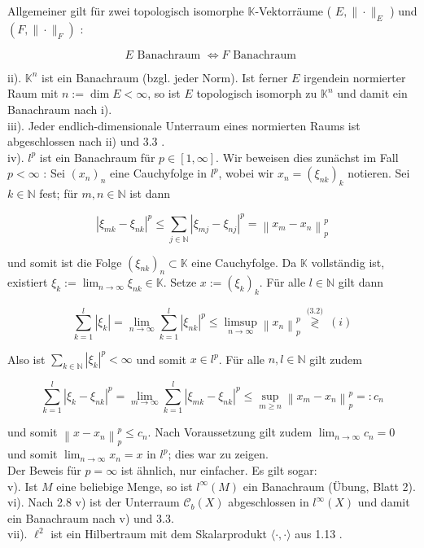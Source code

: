 \documentclass[10pt, letterpaper]{article}
\begin{document}
Allgemeiner gilt für zwei topologisch isomorphe $\mathbb{K}$-Vektorräume ( $E,\|\cdot\|_{E}$ ) und $\left(F,\|\cdot\|_{F}\right)$ :

$$
E \text { Banachraum } \Longleftrightarrow F \text { Banachraum }
$$

ii). $\mathbb{K}^{n}$ ist ein Banachraum (bzgl. jeder Norm). Ist ferner $E$ irgendein normierter Raum mit $n:=\operatorname{dim} E<\infty$, so ist $E$ topologisch isomorph zu $\mathbb{K}^{n}$ und damit ein Banachraum nach i).\\
iii). Jeder endlich-dimensionale Unterraum eines normierten Raums ist abgeschlossen nach ii) und 3.3 .\\
iv). $l^{p}$ ist ein Banachraum für $p \in[1, \infty]$. Wir beweisen dies zunächst im Fall $p<\infty$ : Sei $\left(x_{n}\right)_{n}$ eine Cauchyfolge in $l^{p}$, wobei wir $x_{n}=\left(\xi_{n k}\right)_{k}$ notieren. Sei $k \in \mathbb{N}$ fest; für $m, n \in \mathbb{N}$ ist dann

$$
\left|\xi_{m k}-\xi_{n k}\right|^{p} \leq \sum_{j \in \mathbb{N}}\left|\xi_{m j}-\xi_{n j}\right|^{p}=\left\|x_{m}-x_{n}\right\|_{p}^{p}
$$

und somit ist die Folge $\left(\xi_{n k}\right)_{n} \subset \mathbb{K}$ eine Cauchyfolge. Da $\mathbb{K}$ vollständig ist, existiert $\xi_{k}:=\lim _{n \rightarrow \infty} \xi_{n k} \in \mathbb{K}$. Setze $x:=\left(\xi_{k}\right)_{k}$. Für alle $l \in \mathbb{N}$ gilt dann

$$
\sum_{k=1}^{l}\left|\xi_{k}\right|=\lim _{n \rightarrow \infty} \sum_{k=1}^{l}\left|\xi_{n k}\right|^{p} \leq \limsup _{n \rightarrow \infty}\left\|x_{n}\right\|_{p}^{p} \stackrel{\text { (3.2) }}{\gtrless}(i)
$$

Also ist $\sum_{k \in \mathbb{N}}\left|\xi_{k}\right|^{p}<\infty$ und somit $x \in l^{p}$. Für alle $n, l \in \mathbb{N}$ gilt zudem

$$
\sum_{k=1}^{l}\left|\xi_{k}-\xi_{n k}\right|^{p}=\lim _{m \rightarrow \infty} \sum_{k=1}^{l}\left|\xi_{m k}-\xi_{n k}\right|^{p} \leq \sup _{m \geq n}\left\|x_{m}-x_{n}\right\|_{p}^{p}=: c_{n}
$$

und somit $\left\|x-x_{n}\right\|_{p}^{p} \leq c_{n}$. Nach Voraussetzung gilt zudem $\lim _{n \rightarrow \infty} c_{n}=0$ und somit $\lim _{n \rightarrow \infty} x_{n}=x$ in $l^{p}$; dies war zu zeigen.\\
Der Beweis für $p=\infty$ ist ähnlich, nur einfacher. Es gilt sogar:\\
v). Ist $M$ eine beliebige Menge, so ist $l^{\infty}(M)$ ein Banachraum (Übung, Blatt 2).\\
vi). Nach 2.8 v) ist der Unterraum $\mathcal{C}_{b}(X)$ abgeschlossen in $l^{\infty}(X)$ und damit ein Banachraum nach v) und 3.3.\\
vii). $\ell^{2}$ ist ein Hilbertraum mit dem Skalarprodukt $\langle\cdot, \cdot\rangle$ aus 1.13 .
\end{document}
